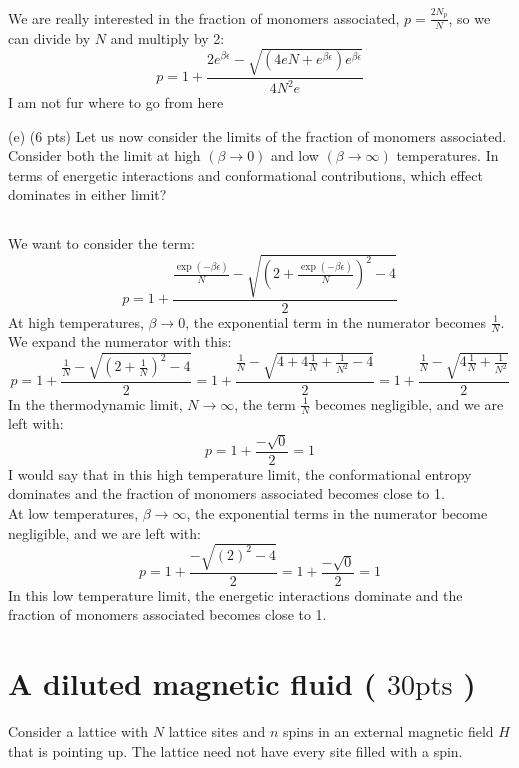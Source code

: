 \documentclass[10pt]{article}
\begin{document}
We are really interested in the fraction of monomers associated, $p = \frac{2N_p}{N}$, so we can divide by $N$ and multiply by 2:
\begin{equation}
  p = 1 + \frac{2e^{\beta \epsilon} - \sqrt{\left(4 e N + e^{\beta \epsilon}\right) e^{\beta \epsilon}}}{4N^2e}
\end{equation}
I am not fur where to go from here

(e) (6 pts) Let us now consider the limits of the fraction of monomers associated. Consider both the limit at high $(\beta \rightarrow 0)$ and low $(\beta \rightarrow \infty)$ temperatures. In terms of energetic interactions and conformational contributions, which effect dominates in either limit?
\subsection{}
We want to consider the term:
\begin{equation}
  p=1+\frac{\frac{\exp (-\beta \epsilon)}{N}-\sqrt{\left(2+\frac{\exp (-\beta \epsilon)}{N}\right)^{2}-4}}{2}
\end{equation}
At high temperatures, $\beta \rightarrow 0$, the exponential term in the numerator becomes $\frac{1}{N}$. We expand the numerator with this:
\begin{equation}
  p=1+\frac{\frac{1}{N}-\sqrt{\left(2+\frac{1}{N}\right)^{2}-4}}{2} = 1+\frac{\frac{1}{N}-\sqrt{4+4\frac{1}{N}+\frac{1}{N^2}-4}}{2} = 1+\frac{\frac{1}{N}-\sqrt{4\frac{1}{N}+\frac{1}{N^2}}}{2}
\end{equation}
In the thermodynamic limit, $N \rightarrow \infty$, the term $\frac{1}{N}$ becomes negligible, and we are left with:
\begin{equation}
  p=1+\frac{-\sqrt{0}}{2} = 1
\end{equation}
I would say that in this high temperature limit, the conformational entropy dominates and the fraction of monomers associated becomes close to 1.\\
At low temperatures, $\beta \rightarrow \infty$, the exponential terms in the numerator become negligible, and we are left with:
\begin{equation}
  p=1+\frac{-\sqrt{\left(2\right)^{2}-4}}{2} = 1+\frac{-\sqrt{0}}{2} = 1
\end{equation}
In this low temperature limit, the energetic interactions dominate and the fraction of monomers associated becomes close to 1.\\

\section{A diluted magnetic fluid ( $30 \mathrm{pts}$ )}
Consider a lattice with $N$ lattice sites and $n$ spins in an external magnetic field $H$ that is pointing up. The lattice need not have every site filled with a spin.
\end{document}
